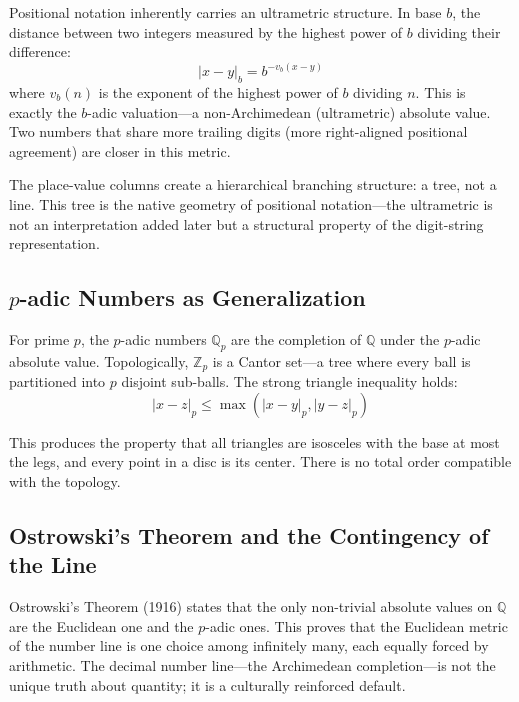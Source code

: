 \documentclass[12pt,a4paper]{article}
\theoremstyle{definition}
\theoremstyle{remark}
\begin{document}
Positional notation inherently carries an ultrametric structure. In base $b$, the distance between two integers measured by the highest power of $b$ dividing their difference:
\begin{equation}
|x - y|_b = b^{-v_b(x-y)}
\end{equation}
where $v_b(n)$ is the exponent of the highest power of $b$ dividing $n$. This is exactly the $b$-adic valuation---a non-Archimedean (ultrametric) absolute value. Two numbers that share more trailing digits (more right-aligned positional agreement) are closer in this metric.

The place-value columns create a hierarchical branching structure: a tree, not a line. This tree is the native geometry of positional notation---the ultrametric is not an interpretation added later but a structural property of the digit-string representation.

\subsection{$p$-adic Numbers as Generalization}

For prime $p$, the $p$-adic numbers $\mathbb{Q}_p$ are the completion of $\mathbb{Q}$ under the $p$-adic absolute value. Topologically, $\mathbb{Z}_p$ is a Cantor set---a tree where every ball is partitioned into $p$ disjoint sub-balls. The strong triangle inequality holds:
\begin{equation}
|x - z|_p \leq \max(|x - y|_p, |y - z|_p)
\end{equation}

This produces the property that all triangles are isosceles with the base at most the legs, and every point in a disc is its center. There is no total order compatible with the topology.

\subsection{Ostrowski's Theorem and the Contingency of the Line}

Ostrowski's Theorem (1916) \cite{ostrowski1916} states that the only non-trivial absolute values on $\mathbb{Q}$ are the Euclidean one and the $p$-adic ones. This proves that the Euclidean metric of the number line is one choice among infinitely many, each equally forced by arithmetic. The decimal number line---the Archimedean completion---is not the unique truth about quantity; it is a culturally reinforced default.
\end{document}
